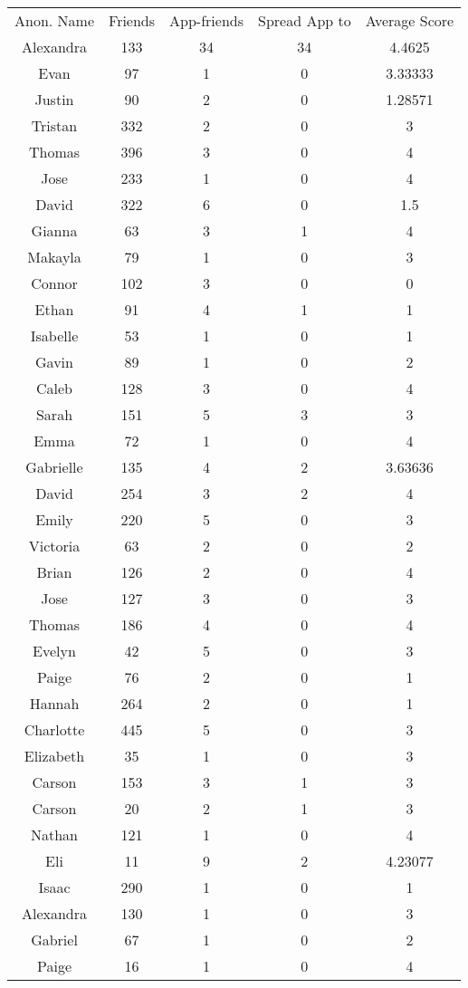 \documentclass[preprint,12pt]{elsarticle}
\begin{document}
 \begin{table}
 \label{tab:spread}
 \begin{tabular}{ c c c c c}
Anon. Name&Friends&App-friends&Spread App to&Average Score	\\
Alexandra & 133& 34& 34 & 4.4625 \\
Evan & 97& 1& 0 & 3.33333 \\
Justin & 90& 2& 0 & 1.28571 \\
Tristan & 332& 2& 0 & 3 \\
Thomas & 396& 3& 0 & 4 \\
Jose & 233& 1& 0 & 4 \\
David & 322& 6& 0 & 1.5 \\
Gianna & 63& 3& 1 & 4 \\
Makayla & 79& 1& 0 & 3 \\
Connor & 102& 3& 0 & 0 \\
Ethan & 91& 4& 1 & 1 \\
Isabelle & 53& 1& 0 & 1 \\
Gavin & 89& 1& 0 & 2 \\
Caleb & 128& 3& 0 & 4 \\
Sarah & 151& 5& 3 & 3 \\
Emma & 72& 1& 0 & 4 \\
Gabrielle & 135& 4& 2 & 3.63636 \\
David & 254& 3& 2 & 4 \\
Emily & 220& 5& 0 & 3 \\
Victoria & 63& 2& 0 & 2 \\
Brian & 126& 2& 0 & 4 \\
Jose & 127& 3& 0 & 3 \\
Thomas & 186& 4& 0 & 4 \\
Evelyn & 42& 5& 0 & 3 \\
Paige & 76& 2& 0 & 1 \\
Hannah & 264& 2& 0 & 1 \\
Charlotte & 445& 5& 0 & 3 \\
Elizabeth & 35& 1& 0 & 3 \\
Carson & 153& 3& 1 & 3 \\
Carson & 20& 2& 1 & 3 \\
Nathan & 121& 1& 0 & 4 \\
Eli & 11& 9& 2 & 4.23077 \\
Isaac & 290& 1& 0 & 1 \\
Alexandra & 130& 1& 0 & 3 \\
Gabriel & 67& 1& 0 & 2 \\
Paige & 16& 1& 0 & 4 \\

\end{tabular}
\end{table}
\end{document}
